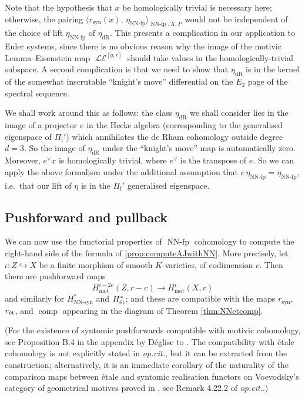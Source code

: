 \documentclass[cjm]{ipart}
\theoremstyle{plain}
\theoremstyle{remark}
\DeclareMathOperator{\LE}{\mathcal{LE}}
\DeclareMathOperator{\mot}{mot}
\DeclareMathOperator{\NNfp}{NN-fp}
\DeclareMathOperator{\NNsyn}{NN-syn}
\DeclareMathOperator{\syn}{syn}
\newcommand{\Pif}{\Pi_{\mathrm{f}}}
\newcommand{\dR}{\mathrm{dR}}
\newcommand{\et}{\text{\textup{\'et}}}
\newcommand{\into}{\hookrightarrow}
\numberwithin{equation}{subsection}
\begin{document}
  \begin{remark}
   \label{rem:homtrivl}
   Note that the hypothesis that $x$ be homologically trivial is necessary here; otherwise, the pairing $\big\langle r_{\syn}(x),\, \eta_{\NNfp} \big\rangle_{\NNfp, X, P}$ would not be independent of the choice of lift $\eta_{\NNfp}$ of $\eta_{\dR}$. This presents a complication in our application to Euler systems, since there is no obvious reason why the image of the motivic Lemma--Eisenstein map $\LE^{[q,r]}$ should take values in the homologically-trivial subspace. A second complication is that we need to show that $\eta_{\dR}$ is in the kernel of the somewhat inscrutable ``knight's move'' differential on the $E_2$ page of the spectral sequence.

   We shall work around this as follows: the class $\eta_{\dR}$ we shall consider lies in the image of a projector $e$ in the Hecke algebra (corresponding to the generalised eigenspace of $\Pif'$) which annihilates the de Rham cohomology outside degree $d = 3$. So the image of $\eta_{\dR}$ under the ``knight's move'' map is automatically zero. Moreover, $e^\vee x$ is homologically trivial, where $e^\vee$ is the transpose of $e$. So we can apply the above formalism under the additional assumption that $e \, \eta_{\NNfp} = \eta_{\NNfp}$, i.e.~that our lift of $\eta$ is in the $\Pif'$ generalised eigenspace.
  \end{remark}

 \subsection{Pushforward and pullback}

  We can now use the functorial properties of $\NNfp$ cohomology to compute the right-hand side of the formula of \cref{prop:computeAJwithNN}. More precisely, let $\iota: Z \into X$ be a finite morphism of smooth $K$-varieties, of codimension $c$. Then there are pushforward maps
  \[ H^{i-2c}_{\mot}(Z, r-c) \to H^i_{\mot}(X, r)\]
  and similarly for $H^*_{\NNsyn}$ and $H^*_{\et}$; and these are compatible with the maps $r_{\syn}$, $r_{\et}$, and $\operatorname{comp}$ appearing in the diagram of Theorem \ref{thm:NNetcomp}.

  (For the existence of syntomic pushforwards compatible with motivic cohomology, see Proposition B.4 in the appendix by D\'eglise to \cite{nekovarniziol16}. The compatibility with \'etale cohomology is not explicitly stated in \emph{op.cit.}, but it can be extracted from the construction; alternatively, it is an immediate corollary of the naturality of the comparison maps between \'etale and syntomic realisation functors on Voevodsky's category of geometrical motives proved in \cite{degliseniziol18}, see Remark 4.22.2 of \emph{op.cit.}.)
\end{document}
